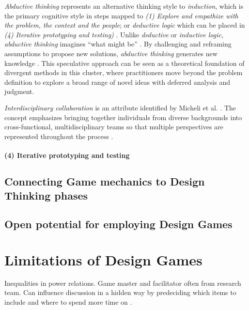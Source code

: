 \documentclass[draft,twoside]{vutinfth}
\begin{document}
                \textit{Abductive thinking} represents an alternative thinking style to \textit{induction}, which is the primary cognitive style in 
                steps mapped to \textit{(1) Explore and empathize with the problem, the context and the people}; or \textit{deductive logic} which can be placed 
                in \textit{(4) Iterative prototyping and testing)} \cite{nhuShortcomingsDesignThinking2019,micheliDoingDesignThinking2019}. Unlike \textit{deductive} or \textit{inductive logic}, \textit{abductive thinking} imagines 
                ``what might be'' \cite{micheliDoingDesignThinking2019}. By challenging and reframing assumptions to propose new solutions, \textit{abductive thinking} 
                generates new knowledge \cite{micheliDoingDesignThinking2019}. This speculative approach can be seen as a theoretical foundation of 
                divergent methods in this cluster, where practitioners move beyond the problem definition to explore a broad range of novel ideas 
                with deferred analysis and judgment. 

                \textit{Interdisciplinary collaboration} is an attribute identified by Micheli et al. \cite{micheliDoingDesignThinking2019}. 
                The concept emphasizes bringing together individuals from diverse backgrounds into cross-functional, multidisciplinary teams so that multiple 
                perspectives are represented throughout the process \cite{micheliDoingDesignThinking2019}. 


            \subsubsection{(4) Iterative prototyping and testing}
            
        
        \section{Connecting Game mechanics to Design Thinking phases}

        \section{Open potential for employing Design Games}
        
        
    \chapter{Limitations of Design Games}
    Inequalities in power relations. Game master and facilitator often from research team. 
    Can influence discussion in a hidden way by predeciding which items to include and where 
    to spend more time on \cite{eriksenTakingDesignGames2014}. 
\end{document}
